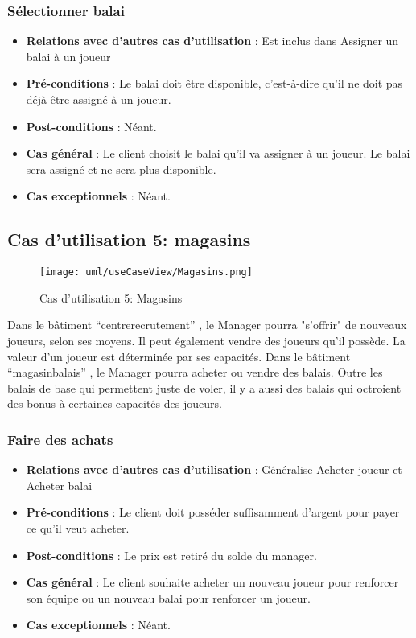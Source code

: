 \documentclass[a4paper,titlepage]{scrreprt}
\begin{document}
    \subsubsection{Sélectionner balai}
      \begin{itemize}
        \item \textbf{Relations avec d'autres cas d'utilisation}  : Est inclus dans Assigner un balai à un joueur
        \item \textbf{Pré-conditions} : Le balai doit être disponible, c’est-à-dire qu’il ne doit pas déjà être assigné à un joueur.
        \item \textbf{Post-conditions} : Néant.
        \item \textbf{Cas général} : Le client choisit le balai qu’il va assigner à un joueur. Le balai sera assigné et ne sera plus disponible.
        \item \textbf{Cas exceptionnels} : Néant.
      \end{itemize}

  \subsection{Cas d'utilisation 5: magasins}
  \begin{figure}[H]
    \center
    \texttt{[image: uml/useCaseView/Magasins.png]}
    \caption{Cas d'utilisation 5: Magasins}
  \end{figure}
  Dans le bâtiment \enquote{\gls{centrerecrutement}} , le Manager pourra "s'offrir" de nouveaux joueurs, 
  selon ses moyens. Il peut également vendre des joueurs qu'il possède. La valeur d'un joueur est déterminée par ses capacités.
  Dans le bâtiment \enquote{\gls{magasinbalais}} , le Manager pourra acheter ou vendre des balais. Outre les balais de base qui permettent juste de voler, 
  il y a aussi des balais qui octroient des bonus à certaines capacités des joueurs.
    \subsubsection{Faire des achats}
      \begin{itemize}
        \item \textbf{Relations avec d'autres cas d'utilisation}  : Généralise Acheter joueur et Acheter balai
        \item \textbf{Pré-conditions} : Le client doit posséder suffisamment d’argent pour payer ce qu’il veut acheter.
        \item \textbf{Post-conditions} : Le prix est retiré du solde du manager.
        \item \textbf{Cas général} : Le client souhaite acheter un nouveau joueur pour renforcer son équipe ou un nouveau balai pour renforcer un joueur.
        \item \textbf{Cas exceptionnels} : Néant.
      \end{itemize}
\end{document}
